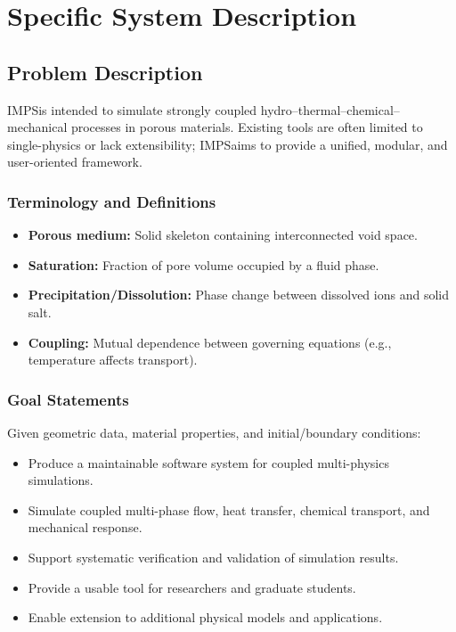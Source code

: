 \documentclass[12pt]{article}
\newcommand{\progname}{IMPS}
\newcounter{goalnum} %
\begin{document}
\section{Specific System Description}

\subsection{Problem Description} \label{Sec_pd}

\progname is intended to simulate strongly coupled hydro--thermal--chemical--mechanical
processes in porous materials. Existing tools are often limited to single-physics
or lack extensibility; \progname aims to provide a unified, modular, and user-oriented framework.

\subsubsection{Terminology and Definitions}

\begin{itemize}
  \item \textbf{Porous medium:} Solid skeleton containing interconnected void space.
  \item \textbf{Saturation:} Fraction of pore volume occupied by a fluid phase.
  \item \textbf{Precipitation/Dissolution:} Phase change between dissolved ions and solid salt.
  \item \textbf{Coupling:} Mutual dependence between governing equations (e.g., temperature affects transport).
\end{itemize}

\subsubsection{Goal Statements}

\noindent Given geometric data, material properties, and initial/boundary conditions:

\begin{itemize}
\item[GS\refstepcounter{goalnum}\thegoalnum \label{G_Maintainable}:]
Produce a maintainable software system for coupled multi-physics simulations.

\item[GS\refstepcounter{goalnum}\thegoalnum \label{G_Simulate}:]
Simulate coupled multi-phase flow, heat transfer, chemical transport, and mechanical response.

\item[GS\refstepcounter{goalnum}\thegoalnum \label{G_Verification}:]
Support systematic verification and validation of simulation results.

\item[GS\refstepcounter{goalnum}\thegoalnum \label{G_Usability}:]
Provide a usable tool for researchers and graduate students.

\item[GS\refstepcounter{goalnum}\thegoalnum \label{G_Extensible}:]
Enable extension to additional physical models and applications.
\end{itemize}
\end{document}
